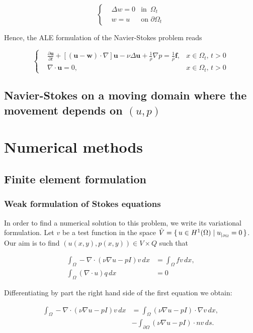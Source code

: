 \documentclass[11pt,a4paper,titlepage]{report}
\begin{document}
\[
\left\{  
\begin{aligned}
& \Delta w = 0 	& \text{in } \, \Omega_t \\
& w = u 				& \text{on } \partial \Omega_t
\end{aligned}
\right.
\]

Hence, the ALE formulation of the Navier-Stokes problem reads

\[
\left\{  
\begin{aligned}
&\frac{\partial \mathbf{u}}{\partial t} + [(\mathbf{u - w}) \cdot \nabla] \mathbf{u} - \nu \Delta \mathbf{u} + \frac{1}{\rho} \nabla p = \frac{1}{\rho} \mathbf{f},  & x \in \Omega_t, \, t>0 \\
& \nabla \cdot \mathbf{u} = 0, & x \in \Omega_t, \, t>0
\end{aligned}
\right.
\]

\section{Navier-Stokes on a moving domain where the movement depends on $(u,p)$}

\chapter{Numerical methods}

\section{Finite element formulation}

\subsection{Weak formulation of Stokes equations}

In order to find a numerical solution to this problem, we write its variational formulation. Let $v$ be a test function in the space $\hat{V} = \set{u \in H^1(\Omega) | u_{|_{\partial \Omega}} = 0} $. Our aim is to find $(u(x,y),p(x,y)) \in V \times Q$ such that

\begin{align}
\int_\Omega -\nabla \cdot (\nu \nabla u - pI)v \,dx &= \int_\Omega fv \,dx, \\
\int_\Omega (\nabla \cdot u)q \,dx &= 0
\end{align}

Differentiating by part the right hand side of the first equation we obtain:

\begin{align}
\int_\Omega -\nabla \cdot (\nu \nabla u - pI)v \,dx &= \int_\Omega (\nu \nabla u - pI) \cdot \nabla v \,dx, \\
&- \int_{\partial \Omega} (\nu \nabla u - pI) \cdot n v \,ds.
\end{align}
\end{document}
